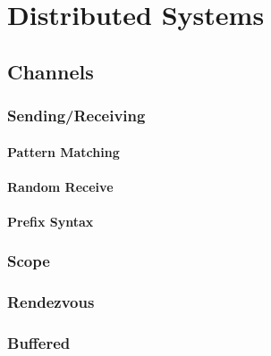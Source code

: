 \documentclass[a4paper, 11pt, accentcolor = tud3b]{tudreport}
\begin{document}
        \section{Distributed Systems} %

            \subsection{Channels} %

                \subsubsection{Sending/Receiving} %

                    \paragraph{Pattern Matching} %

                    \paragraph{Random Receive} %

                    \paragraph{Prefix Syntax} %

                \subsubsection{Scope} %

                \subsubsection{Rendezvous} %

                \subsubsection{Buffered} %
\end{document}
